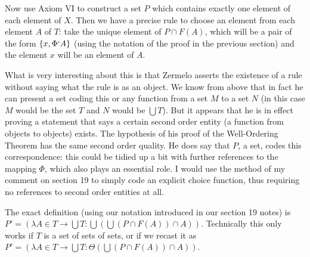 \documentclass[12pt]{article}
\begin{document}
\begin{enumerate}
Now use Axiom VI to construct a set $P$ which contains exactly one element of each element of $X$.  Then we have a precise rule to choose an element
from each element $A$ of $T$:  take the unique element of $P \cap F(A)$, which will be a pair of the form $\{x,\Phi`A\}$ (using the notation of the proof in the previous section)
and the element $x$ will be an element of $A$.

What is very interesting about this is that Zermelo asserts the existence of a rule without saying what the rule is as an object.  We know from above that in fact
he can present a set coding this or any function from a set $M$ to a set $N$ (in this case $M$ would be the set $T$ and $N$ would be $\bigcup T$).  But it appears that he is in effect proving a statement that says a certain second order entity (a function from objects to objects) exists.  The hypothesis of his proof of the Well-Ordering Theorem has the same second order quality.  He does say that $P$, a set, codes this correspondence:  this could be tidied up a bit with further references to the mapping $\Phi$, which also plays an essential role.  I would use the method of my comment on section 19 to simply code an explicit choice function, thus requiring no references to second order entities at all.

The exact definition (using our notation introduced in our section 19 notes) is $P' = (\lambda A \in T \rightarrow \bigcup T:\bigcup (\bigcup(P \cap F(A))\cap A))$.  Technically this only works if $T$ is a set of sets of sets, or if we recast it as $P' = (\lambda A \in T \rightarrow \bigcup T:\Theta (\bigcup(P \cap F(A))\cap A))$.





\end{enumerate}
\end{document}
